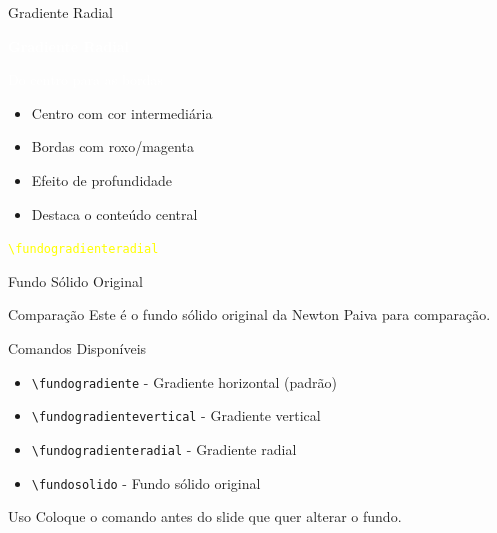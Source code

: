 \documentclass[aspectratio=169]{beamer}
\begin{document}
\fundogradienteradial

\begin{frame}{Gradiente Radial}
    \begin{center}
        \vfill
        \Huge{\textcolor{white}{\textbf{Gradiente Radial}}}
        \vspace{1cm}
        
        \Large{\textcolor{white}{Do centro para as bordas}}
        \vspace{1cm}
        
        \begin{itemize}
            \item Centro com cor intermediária
            \item Bordas com roxo/magenta
            \item Efeito de profundidade
            \item Destaca o conteúdo central
        \end{itemize}
        
        \vspace{1cm}
        \texttt{\textcolor{yellow}{\textbackslash fundogradienteradial}}
        \vfill
    \end{center}
\end{frame}

\fundosolido

\begin{frame}{Fundo Sólido Original}
    \begin{alertblock}{Comparação}
        Este é o fundo sólido original da Newton Paiva para comparação.
    \end{alertblock}
    
    \begin{block}{Comandos Disponíveis}
        \begin{itemize}
            \item \texttt{\textbackslash fundogradiente} - Gradiente horizontal (padrão)
            \item \texttt{\textbackslash fundogradientevertical} - Gradiente vertical
            \item \texttt{\textbackslash fundogradienteradial} - Gradiente radial
            \item \texttt{\textbackslash fundosolido} - Fundo sólido original
        \end{itemize}
    \end{block}
    
    \begin{exampleblock}{Uso}
        Coloque o comando antes do slide que quer alterar o fundo.
    \end{exampleblock}
\end{frame}
\end{document}
